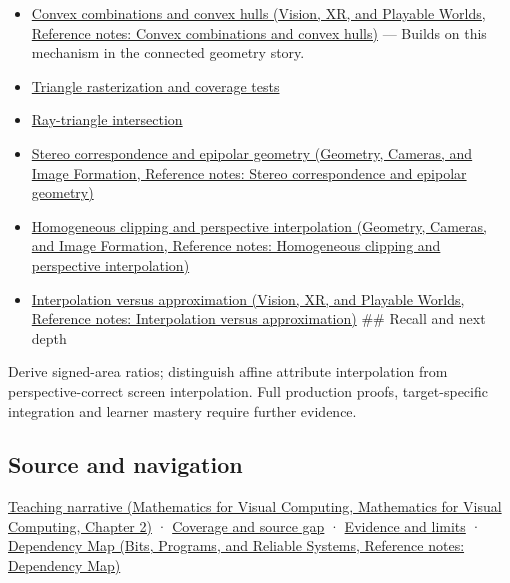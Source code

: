 \begin{itemize}
\item
  \href{../07-Vision-XR-and-Playable-Worlds/main.pdf\#nameddest=appendix-0026ec42c9d5}{Convex combinations and convex hulls (Vision, XR, and Playable Worlds, Reference notes: Convex combinations and convex hulls)} --- Builds on this mechanism in the connected geometry story.
\item
  \hyperref[appendix-ed3f9bc298fe]{Triangle rasterization and coverage tests}
\item
  \hyperref[appendix-47ac1bd6d144]{Ray-triangle intersection}
\item
  \href{../03-Geometry-Cameras-and-Image-Formation/main.pdf\#nameddest=appendix-c4e98b6e4001}{Stereo correspondence and epipolar geometry (Geometry, Cameras, and Image Formation, Reference notes: Stereo correspondence and epipolar geometry)}
\item
  \href{../03-Geometry-Cameras-and-Image-Formation/main.pdf\#nameddest=appendix-40426e4b2103}{Homogeneous clipping and perspective interpolation (Geometry, Cameras, and Image Formation, Reference notes: Homogeneous clipping and perspective interpolation)}
\item
  \href{../07-Vision-XR-and-Playable-Worlds/main.pdf\#nameddest=appendix-0c2a5f69851e}{Interpolation versus approximation (Vision, XR, and Playable Worlds, Reference notes: Interpolation versus approximation)} \#\# Recall and next depth
\end{itemize}

Derive signed-area ratios; distinguish affine attribute interpolation from perspective-correct screen interpolation. Full production proofs, target-specific integration and learner mastery require further evidence.

\subsection{Source and navigation}\label{appendix-02b9d9a81dca-source-and-navigation}

\href{../02-Mathematics-for-Visual-Computing/main.pdf\#nameddest=01-foundations-i-ch018-the-sensor-needs-coordinates-inside-the-triangle}{Teaching narrative (Mathematics for Visual Computing, Mathematics for Visual Computing, Chapter 2)} · \hyperref[appendix-fd090d982a15-phase-6---parts-501-600]{Coverage and source gap} · \hyperref[appendix-a103e7846d21-phase-6---source-analysis-and-verification]{Evidence and limits} · \href{../01-Bits-Programs-and-Reliable-Systems/main.pdf\#nameddest=appendix-4ad47bdd269a}{Dependency Map (Bits, Programs, and Reliable Systems, Reference notes: Dependency Map)}

